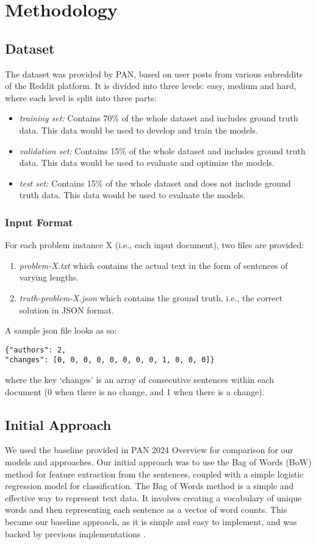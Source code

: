 \section{Methodology}
\subsection{Dataset}
The dataset was provided by PAN, based on user posts from various subreddits of the Reddit platform. It is divided into three levels: easy, medium and hard, where each level is split into three parts:
\begin{itemize}
    \item \textit{training set:} Contains 70\% of the whole dataset and includes ground truth data. This data would be used to develop and train the models.
    \item \textit{validation set:} Contains 15\% of the whole dataset and includes ground truth data. This data would be used to evaluate and optimize the models.
    \item \textit{test set:} Contains 15\% of the whole dataset and does not include ground truth data. This data would be used to evaluate the models.
\end{itemize}

\subsubsection*{Input Format}
For each problem instance X (i.e., each input document), two files are provided:
\begin{enumerate}
    \item \textit{problem-X.txt} which contains the actual text in the form of sentences of varying lengths.
    \item \textit{truth-problem-X.json} which contains the ground truth, i.e., the correct solution in JSON format. 
\end{enumerate}

\noindent A sample json file looks as so:
\begin{verbatim}
{"authors": 2,
"changes": [0, 0, 0, 0, 0, 0, 0, 0, 1, 0, 0, 0]}
\end{verbatim}
where the key `changes' is an array of consecutive sentences within each document (0 when there is no change, and 1 when there is a change). 

\subsection{Initial Approach}
We used the baseline provided in PAN 2024 Overview \cite{paper1} for comparison for our models and approaches. Our initial approach was to use the Bag of Words (BoW) method for feature extraction from the sentences, coupled with a simple logistic regression model for classification. The Bag of Words method is a simple and effective way to represent text data. It involves creating a vocabulary of unique words and then representing each sentence as a vector of word counts. This became our baseline approach, as it is simple and easy to implement, and was backed by previous implementations \cite{paper1}.

